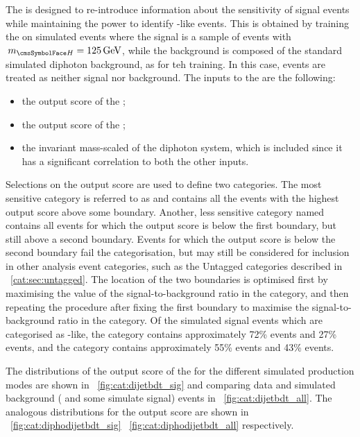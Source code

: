 The \DiPhoDiJetBdt is designed to re-introduce information about the sensitivity of signal events while maintaining the power to identify \VBF-like events. This is obtained by training the \BDT on simulated events where the signal is a sample of \VBF \Hgg events with $\mH=125\GeV$, while the background is composed of the standard simulated diphoton background, as for teh \DiJetBdt training. In this case, \ggH events are treated as neither signal nor background. The inputs to the \BDT are the following:
\begin{itemize}
\item the output score of the \DiPhoBdt;
\item the output score of the \DiJetBdt;
\item the invariant mass-scaled \pT of the diphoton system, which is included since it has a significant correlation to both the other inputs.
\end{itemize}

Selections on the \DiPhoDiJetBdt output score are used to define two \VBFTag categories. The most sensitive category is referred to as  and contains all the events with the highest \DiPhoDiJetBdt output score above some boundary. Another, less sensitive category named  contains all events for which the  \DiPhoDiJetBdt output score  is below the first boundary, but still above a second boundary. Events for which the \DiPhoDiJetBdt output score is below the second boundary fail the \VBFTag categorisation, but may still be considered for inclusion in other analysis event categories, such as the Untagged categories described in \Sec~\ref{cat:sec:untagged}. The location of the two boundaries is optimised first by maximising the value of the signal-to-background ratio in the  category, and then repeating the procedure after fixing the first boundary to maximise the signal-to-background ratio in the  category. Of the simulated signal events which are categorised as \VBF-like, the  category contains approximately 72\% \VBF events and 27\% \ggH events, and the   category contains approximately 55\% \VBF events and 43\% \ggH events. 

The distributions of the output score of the \DiJetBdt for the different simulated production modes are shown in \Fig~\ref{fig:cat:dijetbdt_sig} and comparing data and simulated background ( and some simulate signal) events in \Fig~\ref{fig:cat:dijetbdt_all}. The analogous distributions for the \DiPhoDiJetBdt output score are shown in \Fig~\ref{fig:cat:diphodijetbdt_sig} \Fig~\ref{fig:cat:diphodijetbdt_all} respectively.

